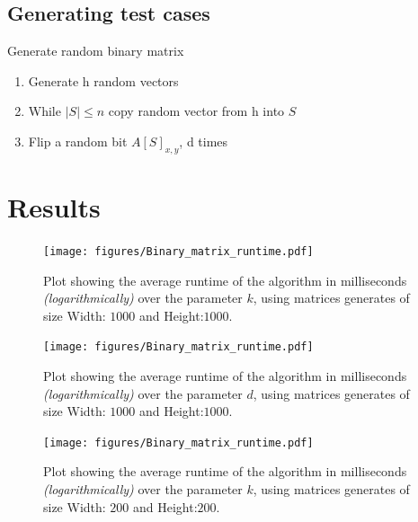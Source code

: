 \documentclass{beamer}
\begin{document}
\subsection{Generating test cases}
\begin{frame}
  \begin{block}{Generate random binary matrix}
    \begin{enumerate}
      \item<1-> Generate \alert{h} random vectors
      \item<2-> While $|S| \leq n$ copy random vector from \alert{h} into $S$
      \item<3-> Flip a random bit $A[S]_{x,y}$, \alert{d} times
    \end{enumerate}
  \end{block}
\end{frame}

\section{Results}
\begin{frame}
  \begin{figure}
    \centering
    \texttt{[image: figures/Binary\_matrix\_runtime.pdf]}
    \caption{Plot showing the average runtime of the algorithm in milliseconds \textit{(logarithmically)}
      over the parameter $k$, using matrices generates of size Width: $1000$ and Height:$1000$.}
  \end{figure}
\end{frame}

\begin{frame}
  \begin{figure}
    \centering
    \texttt{[image: figures/Binary\_matrix\_runtime.pdf]}
    \caption{Plot showing the average runtime of the algorithm in milliseconds \textit{(logarithmically)}
      over the parameter $d$, using matrices generates of size Width: $1000$ and Height:$1000$.}
  \end{figure}
\end{frame}

\begin{frame}
  \begin{figure}
    \centering
    \texttt{[image: figures/Binary\_matrix\_runtime.pdf]}
    \caption{Plot showing the average runtime of the algorithm in milliseconds \textit{(logarithmically)}
      over the parameter $k$, using matrices generates of size Width: $200$ and Height:$200$.}
  \end{figure}
\end{frame}
\end{document}
